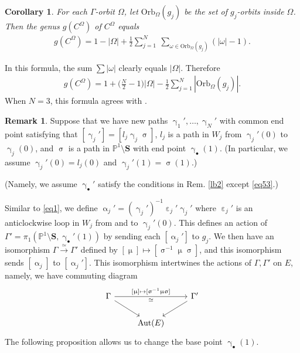 \documentclass[12pt,a4paper,notitlepage]{article}
\theoremstyle{definition}
\newtheorem{rem}[df]{Remark}
\theoremstyle{plain}
\newtheorem{co}[df]{Corollary}
\newcommand{\blt}{\bullet}
\newcommand{\Pbb}{\mathbb P}
\newcommand{\Sbf}{\mathbf{S}}
\newcommand{\Orb}{\mathrm{Orb}}
\numberwithin{equation}{subsection}
\begin{document}
\begin{co}
For each $\Gamma$-orbit $\Omega$, let $\Orb_\Omega(g_j)$ be the set of $g_j$-orbits inside $\Omega$. Then  the genus $g(C^\Omega)$ of $C^\Omega$ equals
\begin{align}\label{eq88}
g(C^\Omega)=1-|\Omega|+\frac 12\sum_{j=1}^N~\sum_{\omega\in\Orb_\Omega(g_j)}(|\omega|-1).
\end{align}
\end{co}

In this formula, the sum $\sum|\omega|$ clearly equals $|\Omega|$. Therefore
\begin{align}
	g(C^\Omega)=1+\Big(\frac N2-1\Big)|\Omega|-\frac 12\sum_{j=1}^N|\Orb_\Omega(g_j)|.\label{eq89}
\end{align}
When $N=3$, this formula agrees with \cite[Lemma 8]{BS11}.



\begin{rem}\label{lb25}
Suppose that we have new paths $\upgamma_1',\dots,\upgamma_N'$ with common end point  satisfying that  $[\upgamma_j']=[l_j\upgamma_j\upsigma]$, $l_j$ is a path in $W_j$ from $\upgamma_j'(0)$ to $\upgamma_j(0)$, and $\upsigma$ is a path in $\Pbb^1\setminus\Sbf$ with end point $\upgamma_\blt(1)$. (In particular, we assume $\upgamma_j'(0)=l_j(0)$ and $\upgamma_j'(1)=\upsigma(1)$.) 
	
(Namely, we assume $\upgamma_\blt'$ satisfy the conditions in Rem. \ref{lb2} except \eqref{eq53}.)
	
Similar to \eqref{eq1}, we define $\upalpha_j'=(\upgamma_j')^{-1}\upepsilon_j'\upgamma_j'$ where $\upepsilon_j'$ is an anticlockwise loop in $W_j$ from and to $\upgamma_j'(0)$. This defines an action of $\Gamma'=\pi_1(\Pbb^1\setminus\Sbf,\upgamma_\blt'(1))$ by sending each $[\upalpha_j']$ to $g_j$. We then have an isomorphism $\Gamma\xrightarrow{\simeq}\Gamma'$ defined by $[\upmu]\mapsto[\upsigma^{-1}\upmu\upsigma]$, and this isomorphism sends $[\upalpha_j]$ to $[\upalpha_j']$. This isomorphism intertwines the actions of $\Gamma,\Gamma'$ on $E$, namely, we have commuting diagram
\begin{equation}\label{eq69}
\begin{tikzcd}
\Gamma\arrow[rr, "\simeq"',"{[\upmu]\mapsto [\upsigma^{-1}\upmu\upsigma]}"] \arrow[dr] && \Gamma'\arrow[dl]\\
&\mathrm{Aut}(E)
\end{tikzcd}	
\end{equation}
The following proposition allows us to change  the base point $\upgamma_\blt(1)$.
\end{rem}
\end{document}
